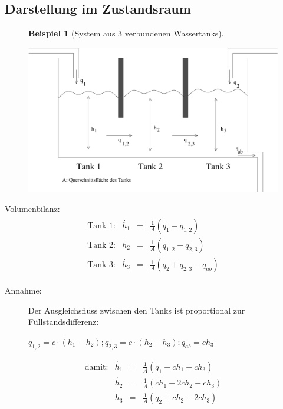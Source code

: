 \documentclass[12pt,a4paper,ngerman]{scrartcl}
\newtheorem{bsp}{Beispiel}[section] %
\begin{document}
\subsection{Darstellung im Zustandsraum}

\begin{figure}[H]
\begin{bsp}[System aus 3 verbundenen Wassertanks]
\end{bsp}
  \centering
  \includegraphics[width=.9\linewidth]{sysregel_bsp_2,2}
\end{figure}
Volumenbilanz:
\begin{align*}
  \begin{array}{llll}
    \text{Tank 1:}&\dot{h_1}&=&\frac{1}{A}(q_1-q_{1,2})\\
    \text{Tank 2:}&\dot{h_2}&=&\frac{1}{A}(q_{1,2}-q_{2,3})\\
    \text{Tank 3:}&\dot{h_3}&=&\frac{1}{A}(q_{2}+q_{2,3}-q_{ab})
  \end{array}
\end{align*}
\begin{description}
\item[Annahme:]Der Ausgleichsfluss zwischen den Tanks ist proportional zur Füllstandsdifferenz: \begin{center}  $q_{1,2}=c\cdot (h_1-h_2);q_{2,3}=c\cdot (h_2-h_3);q_{ab}=ch_3$ \end{center}
\end{description}
\begin{align*}
  \begin{array}{llll}
    \text{damit:}&\dot{h_1}&=&\frac{1}{A}(q_1-ch_1+ch_3)\\
                 &\dot{h_2}&=&\frac{1}{A}(ch_1-2ch_2+ch_3)\\
                 &\dot{h_3}&=&\frac{1}{A}(q_2+ch_2-2ch_3)
  \end{array}
\end{align*}
\end{document}

